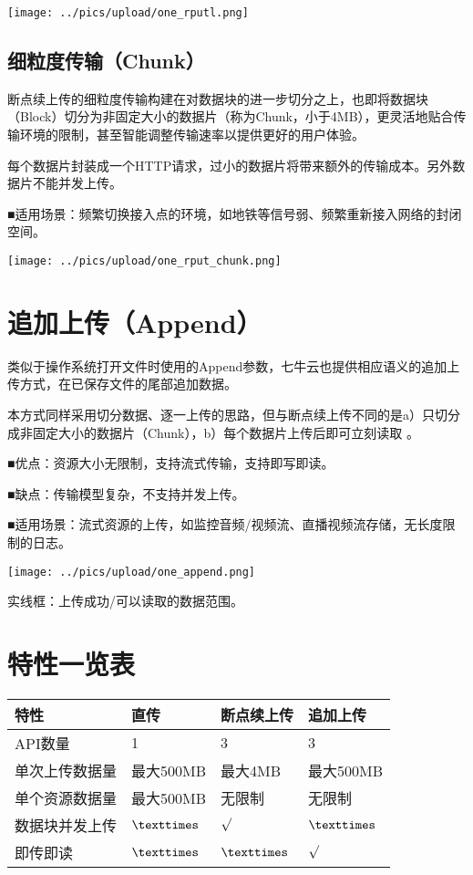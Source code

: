 \documentclass[11pt, oneside]{book}
\newcommand{\qpara}[1]{
\vspace{0.3em}
\noindent
#1\par
\vspace{0.3em}
}
\newcommand{\qtable}[1]{\footnotesize\vspace{0.5em}#1\vspace{0.5em}\normalsize}
\begin{document}
\begin{center}
\texttt{[image: ../pics/upload/one\_rputl.png]}
\end{center}

\subsection{细粒度传输（Chunk）}

\qpara{断点续上传的细粒度传输构建在对数据块的进一步切分之上，也即将数据块（Block）切分为非固定大小的数据片（称为Chunk，小于4MB），更灵活地贴合传输环境的限制，甚至智能调整传输速率以提供更好的用户体验。}
\qpara{每个数据片封装成一个HTTP请求，过小的数据片将带来额外的传输成本。另外数据片不能并发上传。}
\qpara{■\thinspace 适用场景：频繁切换接入点的环境，如地铁等信号弱、频繁重新接入网络的封闭空间。}

\begin{center}
\texttt{[image: ../pics/upload/one\_rput\_chunk.png]}
\end{center}

\section{追加上传（Append）}

\qpara{类似于操作系统打开文件时使用的Append参数，七牛云也提供相应语义的追加上传方式，在已保存文件的尾部追加数据。}
\qpara{本方式同样采用切分数据、逐一上传的思路，但与断点续上传不同的是a）只切分成非固定大小的数据片（Chunk），b）每个数据片上传后即可立刻读取 。}
\qpara{■\thinspace 优点：资源大小无限制，支持流式传输，支持即写即读。}
\qpara{■\thinspace 缺点：传输模型复杂，不支持并发上传。}
\qpara{■\thinspace 适用场景：流式资源的上传，如监控音频/视频流、直播视频流存储，无长度限制的日志。}

\begin{center}
\texttt{[image: ../pics/upload/one\_append.png]}
\end{center}

\qpara{实线框：上传成功/可以读取的数据范围。}

\section{特性一览表}

\qtable{
\def\arraystretch{2}
\begin{tabular}{|l|p{10em}|p{10em}|p{10em}|}
\hline
特性 & 直传 & 断点续上传 & 追加上传 \\
\hline
API数量 & 1 & 3 & 3 \\
\hline
单次上传数据量 & 最大500MB & 最大4MB & 最大500MB \\
\hline
单个资源数据量 & 最大500MB & 无限制 & 无限制 \\
\hline
数据块并发上传 & ${\texttimes}$ & ${\surd}$ & ${\texttimes}$ \\
\hline
即传即读 & ${\texttimes}$ & ${\texttimes}$ & ${\surd}$ \\
\hline
\end{tabular}
}
\end{document}
